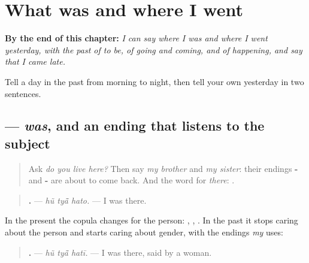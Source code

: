
\chapter{What was and where I went}
\label{ch:gu-what-was-and-where-i-went}

\begin{chapteropening}
\textbf{By the end of this chapter:} \emph{I can say where I was and where I went yesterday, with the past of to be, of going and coming, and of happening, and say that I came late.}

Tell a day in the past from morning to night, then tell your own yesterday in two sentences.
\end{chapteropening}

\section[\texorpdfstring{\gu{હતો} · \gu{હતી} · \gu{હતું} … (hato · hatī …)}{હતો · હતી · હતું … (hato · hatī …)}]{ — \emph{was}, and an ending that listens to the subject}

\label{lesson:GU-C147-hato}



\begin{quote}
Ask \emph{do you live here?} Then say \emph{my brother} and \emph{my sister}: their endings \textbf{-} and \textbf{-} are about to come back. And the word for \emph{there}: \textbf{}.
\end{quote}

\begin{grammarlens}[title={Grammar Lens: \gu{છે} becomes \gu{હતો}}]
\begin{quote}
\textbf{  .} — \emph{hũ tyā̃ hato.} — I was there.
\end{quote}

In the present the copula changes for the person: \textbf{}, \textbf{}, \textbf{}. In the past it stops caring about the person and starts caring about gender, with the endings \emph{my} uses:

\begin{quote}
\textbf{  .} — \emph{hũ tyā̃ hatī.} — I was there, said by a woman.
\end{quote}
\end{grammarlens}

